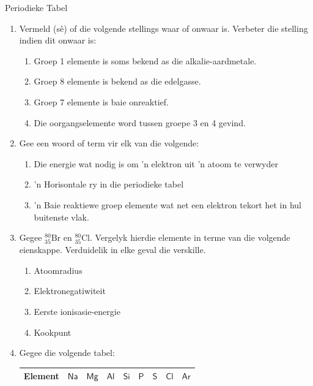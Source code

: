 \begin{eocexercises}{ Periodieke Tabel}
            \nopagebreak \noindent
\label{m38757*uid091221}\begin{enumerate}[noitemsep, label=\textbf{\arabic*}. ] 
\item Vermeld (s\^{e}) of die volgende stellings waar of onwaar is. Verbeter die stelling indien dit onwaar is:
  \label{m38757*id073324}\begin{enumerate}[noitemsep, label=\textbf{\alph*}. ] 
  \item Groep 1 elemente is soms bekend as die alkalie-aardmetale.
  \item Groep 8 elemente is bekend as die edelgasse.
  \item Groep 7 elemente is baie onreaktief.
  \item Die oorgangselemente word tussen groepe 3 en 4 gevind.\end{enumerate}
\item Gee een woord of term vir elk van die volgende:
   \label{m38757*id0734}\begin{enumerate}[noitemsep, label=\textbf{\alph*}. ] 
   \item Die energie wat nodig is om 'n elektron uit 'n atoom te verwyder
   \item 'n Horisontale ry in die periodieke tabel
   \item 'n Baie reaktiewe groep elemente wat net een elektron tekort het in hul buitenste vlak.
   \end{enumerate}
\item Gegee $^{80}_{35}\text{Br}$ en $^{80}_{35}\text{Cl}$. Vergelyk hierdie elemente in terme van die volgende eienskappe. Verduidelik in elke geval die verskille.
  \begin{enumerate}[noitemsep, label=\textbf{\alph*}. ]
   \item Atoomradius
   \item Elektronegatiwiteit
   \item Eerste ionisasie-energie
   \item Kookpunt
  \end{enumerate}
\item Gegee die volgende tabel:
  \begin{table}[H]
   \begin{center}
    \begin{tabular}{|l|l|l|l|l|l|l|l|l|} \hline
     \textbf{Element} & $\textsf{Na}$ & $\textsf{Mg}$ & $\textsf{Al}$ & $\textsf{Si}$ & $\textsf{P}$ & $\textsf{S}$ & $\textsf{Cl}$ & $\textsf{Ar}$ \\ \hline

\end{tabular}
\end{center}
\end{table}
\end{enumerate}
\end{eocexercises}
